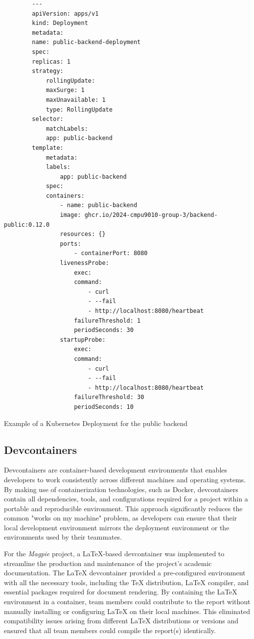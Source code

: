\documentclass[preview]{standalone}
\begin{document}
\begin{listing}[htbp]
    \begin{verbatim}
        ---
        apiVersion: apps/v1
        kind: Deployment
        metadata:
        name: public-backend-deployment
        spec:
        replicas: 1
        strategy:
            rollingUpdate:
            maxSurge: 1
            maxUnavailable: 1
            type: RollingUpdate
        selector:
            matchLabels:
            app: public-backend
        template:
            metadata:
            labels:
                app: public-backend
            spec:
            containers:
                - name: public-backend
                image: ghcr.io/2024-cmpu9010-group-3/backend-public:0.12.0
                resources: {}
                ports:
                    - containerPort: 8080
                livenessProbe:
                    exec:
                    command:
                        - curl
                        - --fail
                        - http://localhost:8080/heartbeat
                    failureThreshold: 1
                    periodSeconds: 30
                startupProbe:
                    exec:
                    command:
                        - curl
                        - --fail
                        - http://localhost:8080/heartbeat
                    failureThreshold: 30
                    periodSeconds: 10
    \end{verbatim}
    \caption{Example of a Kubernetes Deployment for the public backend}
\end{listing}

\subsection{Devcontainers}
Devcontainers are container-based development environments that enables
developers to work consistently across different machines and operating systems.
By making use of containerization technologies, such as Docker, devcontainers
contain all dependencies, tools, and configurations required for a project
within a portable and reproducible environment. This approach significantly
reduces the common "works on my machine" problem, as developers can ensure that
their local development environment mirrors the deployment environment or the
environments used by their teammates.

For the \textit{Magpie} project, a LaTeX-based devcontainer was implemented to
streamline the production and maintenance of the project's academic
documentation. The LaTeX devcontainer provided a pre-configured environment with
all the necessary tools, including the TeX distribution, LaTeX compiler, and
essential packages required for document rendering. By containing the LaTeX
environment in a container, team members could contribute to the report without
manually installing or configuring LaTeX on their local machines. This
eliminated compatibility issues arising from different LaTeX distributions or
versions and ensured that all team members could compile the report(s)
identically.
\end{document}
